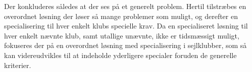 Der konkluderes således at der ses på et generelt problem. Hertil tilstræbes en overordnet løsning der løser så mange problemer som muligt, og derefter en specialisering til hver enkelt klubs specielle krav. Da en specialiseret løsning til hver enkelt nævnte klub, samt utallige unævnte, ikke er tidsmæssigt muligt, fokuseres der på en overordnet løsning med specialisering i sejlklubber, som så kan videreudvikles til at indeholde yderligere specialer foruden de generelle kriterier.


\cbend